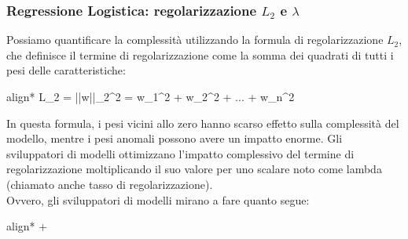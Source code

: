 \begin{frame}
	
	\frametitle{Regressione Logistica: regolarizzazione $L_2$ e $\lambda$}

	Possiamo quantificare la complessità utilizzando la formula di regolarizzazione $L_2$, che definisce il termine di regolarizzazione come la somma dei quadrati di tutti i pesi delle caratteristiche:
	\begin{empheq}[box=\fcolorbox{blue!40!black!60}{yellow!10}]{align*}
	L_2 = ||\boldsymbol w||_2^2 = {w_1^2 + w_2^2 + ... + w_n^2}
	\end{empheq}
	
	In questa formula, i pesi vicini allo zero hanno scarso effetto sulla complessità del modello, mentre i pesi anomali possono avere un impatto enorme.
	\newlinedouble
	Gli sviluppatori di modelli ottimizzano l'impatto complessivo del termine di regolarizzazione moltiplicando il suo valore per uno scalare noto come lambda (chiamato anche tasso di regolarizzazione).\\
	Ovvero, gli sviluppatori di modelli mirano a fare quanto segue:
	\begin{empheq}[box=\fcolorbox{blue!40!black!60}{yellow!10}]{align*}
	 + \lambda {}
	\end{empheq}
\end{frame}